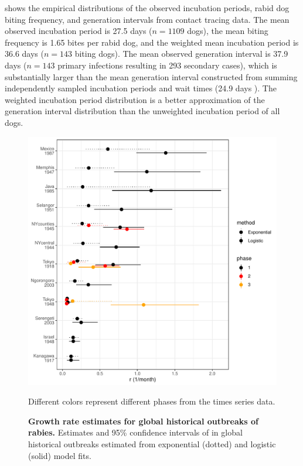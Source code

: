  shows the empirical distributions of the observed incubation periods, rabid dog biting frequency, and generation intervals from contact tracing data.
The mean observed incubation period is 27.5 days ($n = 1109$ dogs), the mean biting frequency is 1.65 bites per rabid dog, and the weighted mean incubation period is 36.6 days ($n = 143$ biting dogs).
The mean observed generation interval is 37.9 days ($n = 143$ primary infections resulting in 293 secondary cases), which is substantially larger than the mean generation interval constructed from summing independently sampled incubation periods and wait times (24.9 days \citep{hampson2009transmission}).
The weighted incubation period distribution is a better approximation of the generation interval distribution than the unweighted incubation period of all dogs.

\begin{center}
\begin{figure}[h]
\includegraphics[page=1,scale = 0.7]{rplot_combo.Rout.pdf}
\caption{\textbf{Growth rate estimates for global historical outbreaks of rabies.} Estimates and 95\% confidence intervals of \littler in global historical outbreaks estimated from exponential (dotted) and logistic (solid) model fits.}
Different colors represent different phases from the times series data.
\end{figure}
\end{center}

